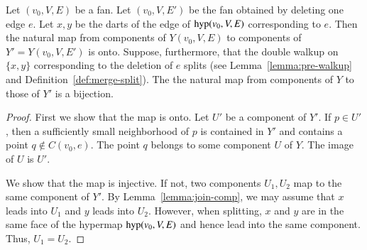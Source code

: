 \begin{lemma}
Let $(v_0,V,E)$ be a fan.  Let $(v_0,V,E')$
be the fan obtained by deleting one edge $e$.
Let $x,y$ be the darts of the edge of
${\operatorname{hyp}}(v_0,V,E)$ corresponding
to $e$.  Then
the natural map from components of $Y(v_0,V,E)$ to components
of $Y'=Y(v_0,V,E')$ is onto.
Suppose, furthermore, that the double walkup
on $\{x,y\}$ corresponding to the deletion of $e$ splits
(see Lemma~\ref{lemma:pre-walkup} 
and Definition~\ref{def:merge-split}).  
The the natural map from components of $Y$ to those of $Y'$ is a bijection.
\end{lemma}

\begin{proof}
First we show that the map is onto.  Let $U'$
be a component of $Y'$.  If $p\in U'$,
then a sufficiently small neighborhood of $p$ is contained
in $Y'$ and contains a point $q\not\in C(v_0,e)$.  The
point $q$ belongs to some component $U$ of $Y$.  The image
of $U$ is $U'$.

We show that the map is injective.  If not, two
components $U_1,U_2$ map to the same component of $Y'$.
By Lemma~\ref{lemma:join-comp}, we may assume
that $x$ leads into $U_1$ and
$y$ leads into $U_2$.
However, when splitting, $x$ and $y$ are in the same face of
the hypermap ${\operatorname{hyp}}(v_0,V,E)$ and hence lead into the
same component.  Thus, $U_1=U_2$.
\end{proof}

%
%

